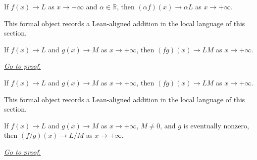 \begin{remark*}
If $f(x)\to L$ as $x\to+\infty$ and $\alpha\in\mathbb R$, then $(\alpha f)(x)\to\alpha L$ as $x\to+\infty$.
\end{remark*}

\begin{remark*}[Interpretation]
This formal object records a Lean-aligned addition in the local language of this section.
\end{remark*}

\begin{dependencies}
\NoLocalDependencies
\end{dependencies}
\begin{theorem}
\label{thm:tendsto-infty-mul}
If $f(x)\to L$ and $g(x)\to M$ as $x\to+\infty$, then $(fg)(x)\to LM$ as $x\to+\infty$.

\smallskip
\noindent
\hyperref[prf:tendsto-infty-mul]{\textit{Go to proof.}}
\end{theorem}

\begin{remark*}
If $f(x)\to L$ and $g(x)\to M$ as $x\to+\infty$, then $(fg)(x)\to LM$ as $x\to+\infty$.
\end{remark*}

\begin{remark*}[Interpretation]
This formal object records a Lean-aligned addition in the local language of this section.
\end{remark*}

\begin{dependencies}
\NoLocalDependencies
\end{dependencies}
\begin{theorem}
\label{thm:tendsto-infty-div}
If $f(x)\to L$ and $g(x)\to M$ as $x\to+\infty$, $M\ne0$, and $g$ is eventually nonzero, then $(f/g)(x)\to L/M$ as $x\to+\infty$.

\smallskip
\noindent
\hyperref[prf:tendsto-infty-div]{\textit{Go to proof.}}
\end{theorem}

